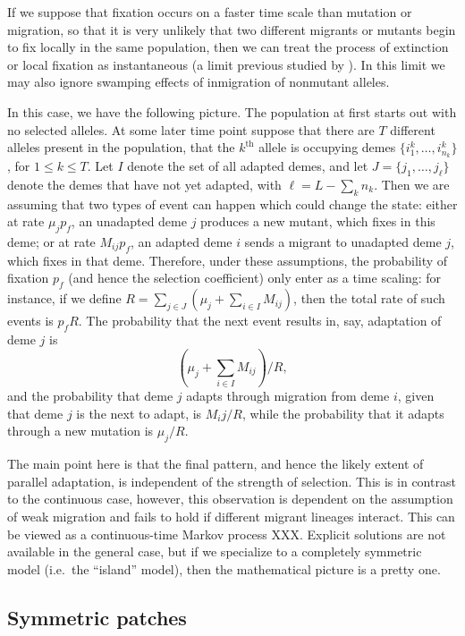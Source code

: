 \documentclass{article}
\begin{document}
If we suppose that fixation occurs on a faster time scale than mutation or migration,
so that it is very unlikely that two different migrants or mutants begin to fix locally in the same population,
then we can treat the process of extinction or local fixation as instantaneous 
(a limit previous studied by \cite{Slatkin:81}).
In this limit we may also ignore swamping effects of inmigration of nonmutant alleles.

In this case, we have the following picture.
The population at first starts out with no selected alleles. 
At some later time point suppose that there are $T$ different alleles present in the population, 
that the $k^\mathrm{th}$ allele is occupying demes $\{i^k_1, \ldots, i^k_{n_k}\}$, for $1\le k \le T$.
Let $I$ denote the set of all adapted demes, 
and let $J = \{j_1, \ldots, j_\ell\}$ denote the demes that have not yet adapted, with $\ell = L - \sum_k n_k$.
Then we are assuming that two types of event can happen which could change the state:
either at rate $\mu_j p_f$, an unadapted deme $j$ produces a new mutant, which fixes in this deme;
or at rate $M_{ij} p_f$, an adapted deme $i$ sends a migrant to unadapted deme $j$, which fixes in that deme.
Therefore, under these assumptions, the probability of fixation $p_f$ (and hence the selection coefficient)
only enter as a time scaling: for instance,
if we define $R = \sum_{j \in J} \left( \mu_j + \sum_{i \in I} M_{ij} \right)$,
then the total rate of such events is $p_f R$.
The probability that the next event results in, say, adaptation of deme $j$
is 
\[
 \left( \mu_j + \sum_{i \in I} M_{ij} \right) / R,
\]
and the probability that deme $j$ adapts through migration from deme $i$, given that deme $j$ is the next to adapt, is
$M_ij / R$,
while the probability that it adapts through a new mutation is $\mu_j / R$.

The main point here is that the final pattern,
and hence the likely extent of parallel adaptation,
is independent of the strength of selection.
This is in contrast to the continuous case, however, this observation is dependent on the assumption of weak migration
and fails to hold if different migrant lineages interact.
This can be viewed as a continuous-time Markov process XXX.
Explicit solutions are not available in the general case,
but if we specialize to a completely symmetric model (i.e.\ the ``island'' model),
then the mathematical picture is a pretty one.

\subsection{Symmetric patches}
\end{document}
